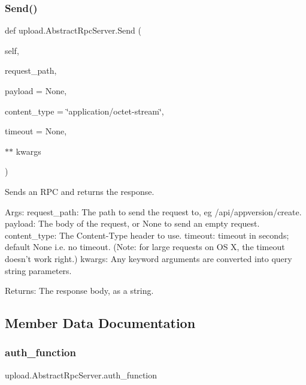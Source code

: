 \subsubsection{\texorpdfstring{Send()}{Send()}\hspace{0.1cm}{\footnotesize\ttfamily [2/2]}}
{\footnotesize\ttfamily def upload.\+Abstract\+Rpc\+Server.\+Send (\begin{DoxyParamCaption}\item[{}]{self,  }\item[{}]{request\+\_\+path,  }\item[{}]{payload = {\ttfamily None},  }\item[{}]{content\+\_\+type = {\ttfamily \char`\"{}application/octet-\/stream\char`\"{}},  }\item[{}]{timeout = {\ttfamily None},  }\item[{$\ast$$\ast$}]{kwargs }\end{DoxyParamCaption})}

\begin{DoxyVerb}Sends an RPC and returns the response.

Args:
  request_path: The path to send the request to, eg /api/appversion/create.
  payload: The body of the request, or None to send an empty request.
  content_type: The Content-Type header to use.
  timeout: timeout in seconds; default None i.e. no timeout.
(Note: for large requests on OS X, the timeout doesn't work right.)
  kwargs: Any keyword arguments are converted into query string parameters.

Returns:
  The response body, as a string.
\end{DoxyVerb}
 

\subsection{Member Data Documentation}
\mbox{\label{classupload_1_1AbstractRpcServer_aee0090a3bcf07b913a7dd596a5dabb8f}} 
\subsubsection{\texorpdfstring{auth\_function}{auth\_function}}
{\footnotesize\ttfamily upload.\+Abstract\+Rpc\+Server.\+auth\+\_\+function}

